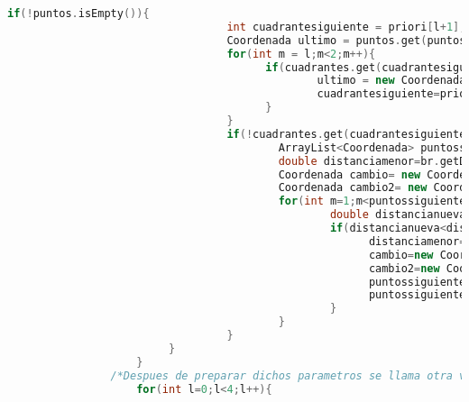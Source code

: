\begin{lstlisting}[language=C++, caption=Algoritmo Base del Método de Cuadrantes, label=lst:codigo11,escapechar=|]
                          if(!puntos.isEmpty()){
                                  int cuadrantesiguiente = priori[l+1];
                                  Coordenada ultimo = puntos.get(puntos.size()-1);
                                  for(int m = l;m<2;m++){
                                        if(cuadrantes.get(cuadrantesiguiente).isEmpty() && l<2) {
                                                ultimo = new Coordenada(centro.x,centro.y);
                                                cuadrantesiguiente=priori[m+1]; 
                                        }
                                  }
                                  if(!cuadrantes.get(cuadrantesiguiente).isEmpty()){
                                          ArrayList<Coordenada> puntossiguientes=cuadrantes.get(cuadrantesiguiente); 
                                          double distanciamenor=br.getDistance(ultimo,puntossiguientes.get(0));
                                          Coordenada cambio= new Coordenada(puntossiguientes.get(0).x,puntossiguientes.get(0).y);  
                                          Coordenada cambio2= new Coordenada(puntossiguientes.get(0).x, puntossiguientes.get(0).y);                      
                                          for(int m=1;m<puntossiguientes.size();m++){
                                                  double distancianueva=br.getDistance(ultimo,puntossiguientes.get(m));
                                                  if(distancianueva<distanciamenor){                               
                                                        distanciamenor=distancianueva;
                                                        cambio=new Coordenada(puntossiguientes.get(0).x, puntossiguientes.get(0).y);
                                                        cambio2=new Coordenada(puntossiguientes.get(m).x,puntossiguientes.get(m).y);   
                                                        puntossiguientes.get(0).setCoords(cambio2.x, cambio2.y);
                                                        puntossiguientes.get(m).setCoords(cambio.x, cambio.y);                  
                                                  }
                                          }                       
                                  }
                         }
                    }
                /*Despues de preparar dichos parametros se llama otra ves al metodo resolverruta en cada cuadrante, el resultado se añadira a la lista total, se pueden llegar a repetir estas llamadas hasta que satisfaga el limite*/
                    for(int l=0;l<4;l++){

\end{lstlisting}
